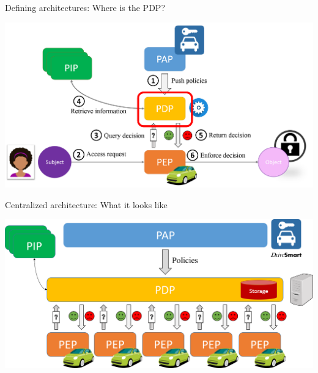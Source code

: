 \begin{frame}{Defining architectures: Where is the PDP?}
    \begin{center}
        \includegraphics[scale=0.33]{Figures/AC_instance_7.png}
    \end{center}
    
\end{frame}

\begin{frame}{Centralized architecture: What it looks like}
    \begin{center}
        \includegraphics[scale=0.33]{Figures/central_archi.png}
    \end{center}
    
\end{frame}


